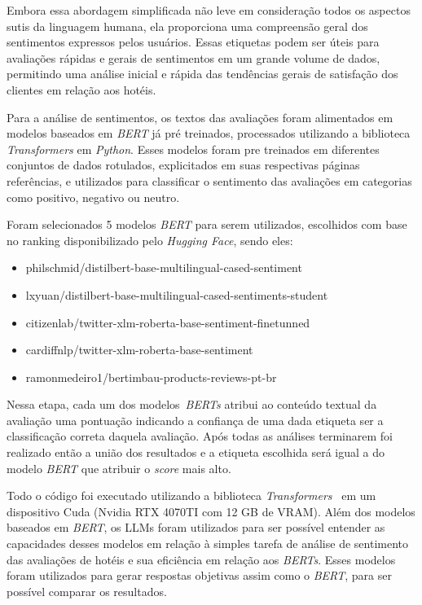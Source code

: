 Embora essa abordagem simplificada não leve em consideração todos os aspectos sutis da linguagem humana, ela proporciona uma compreensão geral dos sentimentos expressos pelos usuários. Essas etiquetas podem ser úteis para avaliações rápidas e gerais de sentimentos em um grande volume de dados, permitindo uma análise inicial e rápida das tendências gerais de satisfação dos clientes em relação aos hotéis.

Para a análise de sentimentos, os textos das avaliações foram alimentados em modelos baseados em \textit{BERT} já pré treinados, processados utilizando a biblioteca \textit{Transformers} em \textit{Python}. Esses modelos foram pre treinados em diferentes conjuntos de dados rotulados, explicitados em suas respectivas páginas referências, e utilizados para classificar o sentimento das avaliações em categorias como positivo, negativo ou neutro.

Foram selecionados 5 modelos \textit{BERT} para serem utilizados, escolhidos com base no ranking disponibilizado pelo \textit{Hugging Face}, sendo eles:

\begin{itemize}
	\item philschmid/distilbert-base-multilingual-cased-sentiment \cite{Sanh2019DistilBERTAD}
	\item lxyuan/distilbert-base-multilingual-cased-sentiments-student \cite{lik_xun_yuan_2023}
	\item citizenlab/twitter-xlm-roberta-base-sentiment-finetunned \cite{robertaCitizenlab2022}
	\item cardiffnlp/twitter-xlm-roberta-base-sentiment \cite{barbieri2022xlmtmultilinguallanguagemodels}
	\item ramonmedeiro1/bertimbau-products-reviews-pt-br \cite{bertimbauRamon2023}
\end{itemize}

Nessa etapa, cada um dos modelos~\textit{BERTs} atribui ao conteúdo textual da avaliação uma pontuação indicando a confiança de uma dada etiqueta ser a classificação correta daquela avaliação. Após todas as análises terminarem foi realizado então a união dos resultados e a etiqueta escolhida será igual a do modelo \textit{BERT} que atribuir o \emph{score} mais alto.

Todo o código foi executado utilizando a biblioteca \textit{Transformers}~\cite{Wolf_Transformers_State-of-the-Art_Natural_2020} em um dispositivo Cuda (Nvidia RTX 4070TI com 12 GB de VRAM). Além dos modelos baseados em \textit{BERT}, os LLMs foram utilizados para ser possível entender as capacidades desses modelos em relação à simples tarefa de análise de sentimento das avaliações de hotéis e sua eficiência em relação aos \textit{BERTs}. Esses modelos foram utilizados para gerar respostas objetivas assim como o \textit{BERT}, para ser possível comparar os resultados.

